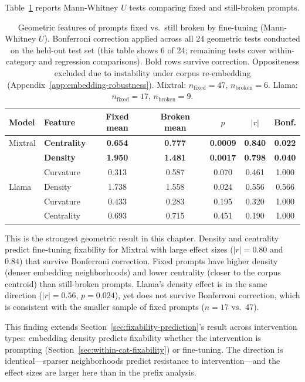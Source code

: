 Table~\ref{tab:ft-bridge} reports Mann-Whitney $U$ tests comparing fixed and still-broken prompts.

\begin{table}[ht]
\centering
\small
\begin{tabular}{@{}llccccc@{}}
\toprule
\textbf{Model} & \textbf{Feature} & \textbf{Fixed mean} & \textbf{Broken mean} & $p$ & $|r|$ & \textbf{Bonf.} \\
\midrule
Mixtral & \textbf{Centrality} & \textbf{0.654} & \textbf{0.777} & \textbf{0.0009} & \textbf{0.840} & \textbf{0.022} \\
        & \textbf{Density} & \textbf{1.950} & \textbf{1.481} & \textbf{0.0017} & \textbf{0.798} & \textbf{0.040} \\
        & Curvature & 0.313 & 0.587 & 0.070 & 0.461 & 1.000 \\
\addlinespace
Llama   & Density & 1.738 & 1.558 & 0.024 & 0.556 & 0.566 \\
        & Curvature & 0.433 & 0.283 & 0.195 & 0.320 & 1.000 \\
        & Centrality & 0.693 & 0.715 & 0.451 & 0.190 & 1.000 \\
\bottomrule
\end{tabular}
\caption{Geometric features of prompts fixed vs.\ still broken by fine-tuning (Mann-Whitney $U$). Bonferroni correction applied across all 24 geometric tests conducted on the held-out test set (this table shows 6 of 24; remaining tests cover within-category and regression comparisons). Bold rows survive correction. Oppositeness excluded due to instability under corpus re-embedding (Appendix~\ref{app:embedding-robustness}). Mixtral: $n_{\text{fixed}} = 47$, $n_{\text{broken}} = 6$. Llama: $n_{\text{fixed}} = 17$, $n_{\text{broken}} = 9$.}
\label{tab:ft-bridge}
\end{table}

This is the strongest geometric result in this chapter. Density and centrality predict fine-tuning fixability for Mixtral with large effect sizes ($|r| = 0.80$ and $0.84$) that survive Bonferroni correction. Fixed prompts have higher density (denser embedding neighborhoods) and lower centrality (closer to the corpus centroid) than still-broken prompts. Llama's density effect is in the same direction ($|r| = 0.56$, $p = 0.024$), yet does not survive Bonferroni correction, which is consistent with the smaller sample of fixed prompts ($n = 17$ vs.\ 47).

This finding extends Section~\ref{sec:fixability-prediction}'s result across intervention types: embedding density predicts fixability whether the intervention is prompting (Section~\ref{sec:within-cat-fixability}) or fine-tuning. The direction is identical---sparser neighborhoods predict resistance to intervention---and the effect sizes are larger here than in the prefix analysis.

